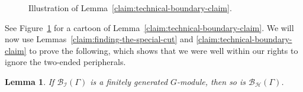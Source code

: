 \documentclass[11pt,a4paper]{amsart}
\newtheorem{lemma}[theorem]{Lemma}
\theoremstyle{definition}
\newcommand{\per}{\mathcal{H}}
\newcommand{\br}{{\mathscr{B}}}
\begin{document}
\begin{figure}
\begin{tikzpicture}[x=0.75pt,y=0.75pt,yscale=-1,xscale=1]
\end{tikzpicture}

        \caption{Illustration of Lemma~\ref{claim:technical-boundary-claim}.}
        \label{fig:technical-boundary-claim}
    \end{figure}

    See Figure~\ref{fig:technical-boundary-claim} for a cartoon of Lemma~\ref{claim:technical-boundary-claim}.
    We will now use Lemmas~\ref{claim:finding-the-special-cut} and \ref{claim:technical-boundary-claim} to prove the following, which shows that we were well within our rights to ignore the two-ended peripherals.


    \begin{lemma}\label{claim:I-fg-implies-H-fg}
        If $\br_{\mathcal I}(\Gamma)$ is a finitely generated $G$-module, then so is $\br_\per(\Gamma)$. 
    \end{lemma}
\end{document}
